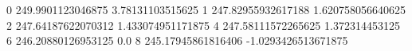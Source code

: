 0 249.9901123046875 3.78131103515625
1 247.82955932617188 1.620758056640625
2 247.64187622070312 1.433074951171875
4 247.58111572265625 1.372314453125
6 246.20880126953125 0.0
8 245.17945861816406 -1.0293426513671875
